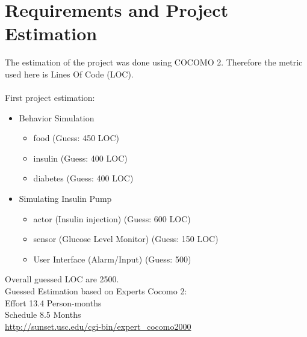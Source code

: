 \documentclass[pdflatex,a4paper,11pt,english]{scrreprt}
\begin{document}
\section{Requirements and Project Estimation}
The estimation of the project was done using COCOMO 2. Therefore the metric used here is Lines Of Code (LOC). \\ \\
First project estimation:
\begin{itemize}
  \item Behavior Simulation
  	\begin{itemize}
        \item food (Guess: 450 LOC)
        \item insulin (Guess: 400 LOC)
        \item diabetes (Guess: 400 LOC)
    \end{itemize}
  \item Simulating Insulin Pump
  	\begin{itemize}
        \item actor (Insulin injection) (Guess: 600 LOC)
        \item sensor (Glucose Level Monitor) (Guess: 150 LOC)
        \item User Interface (Alarm/Input) (Guess: 500)
    \end{itemize}
\end{itemize} 
Overall guessed LOC are 2500. \\
Guessed Estimation based on Experts Cocomo 2: \\
Effort 13.4 Person-months \\
Schedule 8.5 Months \\
\url{http://sunset.usc.edu/cgi-bin/expert_cocomo2000}

\newpage
\end{document}
